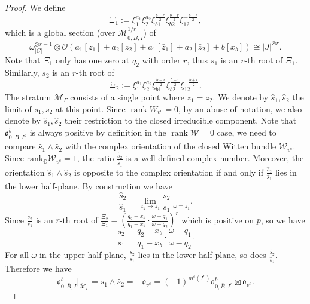 \documentclass[11pt,a4paper]{article}
\theoremstyle{definition}
\theoremstyle{remark}
\numberwithin{equation}{section}
\def\Mbar{{\overline{\mathcal M}}}
\begin{document}
\begin{proof}
    We define
    $$
    \Xi_1:=\xi_1^{a_1} \xi_2^{a_2} \xi_{b1}^{\frac{b+r}{2}} \xi_{b2}^{\frac{b-r}{2}}\xi_{12}^{-\frac{b+r}{2}},
    $$
    which is a global section (over $\mathcal M^{1/r}_{0,\bar{B},I}$) of 
    $$
    \omega^{\otimes r-1}_{\lvert C\rvert}\otimes \mathcal O\left(a_1[z_1]+a_2[z_2]+a_1[\bar z_1]+a_2[\bar z_2]+b[x_b] \right)\cong \lvert J\rvert^{\otimes r}.
    $$ 
    Note that $\Xi_1$ only has one zero at $q_2$ with order $r$, thus $s_1$ is an $r$-th root of $\Xi_1$. Similarly, $s_2$ is an $r$-th root of 
    $$
    \Xi_2:=\xi_1^{a_1} \xi_2^{a_2} \xi_{b1}^{\frac{b-r}{2}} \xi_{b2}^{\frac{b+r}{2}}\xi_{12}^{-\frac{b+r}{2}}.
    $$
     The stratum $\overline{\mathcal M}_\Gamma$ consists of a single point where $z_1=z_2$. We denote by $\hat s_1,\hat s_2$ the limit of $s_1,s_2$ at this point. Since $\operatorname{rank} W_{v^o}=0$, by an abuse of notation, we also denote by $\hat s_1,\hat s_2$ their restriction to the closed irreducible component. Note that $ {\mathfrak{o}}^b_{0,\bar B,I^o}$ is always positive by definition in the $\operatorname{rank} \mathcal W=0$ case, we need to compare $\hat s_1\wedge\hat s_2$ with the complex orientation of the closed Witten bundle $\mathcal W_{v^c}$. Since $\operatorname{rank_{\mathbb C}} \mathcal W_{v^c}=1$, the ratio $\frac{\hat s_2}{\hat s_1}$ is a well-defined complex number. Moreover, the orientation $\hat s_1\wedge\hat s_2$ is opposite to the complex orientation if and only if $\frac{\hat s_2}{\hat s_1}$ lies in the lower half-plane.  By construction we have 
     $$
        \frac{\hat s_2}{\hat s_1}=\lim_{z_2\to z_1}\frac{s_2}{s_1}\Big\vert_{\omega=z_1}.
     $$
     Since $\frac{s_2}{s_1}$ is an $r$-th root of $\frac{\Xi_2}{\Xi_1}=\left(\frac{q_2-x_b}{q_1-x_b}\cdot\frac{\omega-q_1}{\omega-q_2}\right)^r$ which is positive on $p$, so we have
     $$
      \frac{s_2}{s_1}=\frac{q_2-x_b}{q_1-x_b}\cdot\frac{\omega-q_1}{\omega-q_2}.
     $$
     For all $\omega$ in the upper half-plane, $\frac{s_2}{s_1}$ lies in the  lower half-plane, so does $\frac{\hat s_2}{\hat s_1}$. Therefore we have
     $$
     {\mathfrak{o}}^b_{0,\bar B,I}|_{\Mbar_\Gamma} =\hat s_1\wedge\hat s_2=-{\mathfrak{o}}_{v^c} =(-1)^{m^c(I^c)}{\mathfrak{o}}^b_{0,\bar B,I^o}\boxtimes {\mathfrak{o}}_{v^c}.
     $$
     
\end{proof} 
\end{document}
